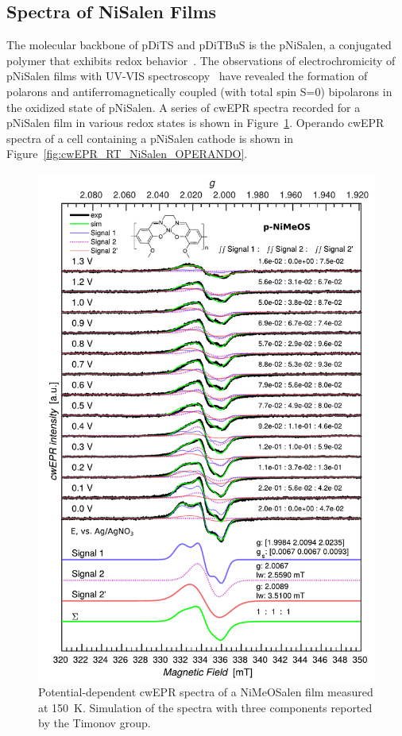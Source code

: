 \subsection{Spectra of NiSalen Films}
The molecular backbone of pDiTS and pDiTBuS is the pNiSalen, a conjugated polymer that exhibits redox behavior~\cite{Dmitrieva2018,Verechchagin_2020,Apraksin2021}. The observations of electrochromicity of pNiSalen films with UV-VIS spectroscopy~\cite{Dmitrieva2018} have revealed the formation of polarons and antiferromagnetically coupled (with total spin S=0) bipolarons in the oxidized state of pNiSalen. A series of cwEPR spectra recorded for a pNiSalen film in various redox states is shown in Figure~\ref{fig:cwEPR_CRYO_NiSalen_REDOX_SIM}. Operando cwEPR spectra of a cell containing a pNiSalen cathode is shown in Figure~\ref{fig:cwEPR_RT_NiSalen_OPERANDO}.

\begin{figure}[!h]
\center
	\includegraphics[width=1\textwidth]{./operando_epr/figures/CRYO/Figure_S8.pdf}
	\caption{Potential-dependent cwEPR spectra of a NiMeOSalen film measured at 150~K. Simulation of the spectra with three components reported by the Timonov group.}
	\label{fig:cwEPR_CRYO_NiSalen_REDOX_SIM}
\end{figure}

